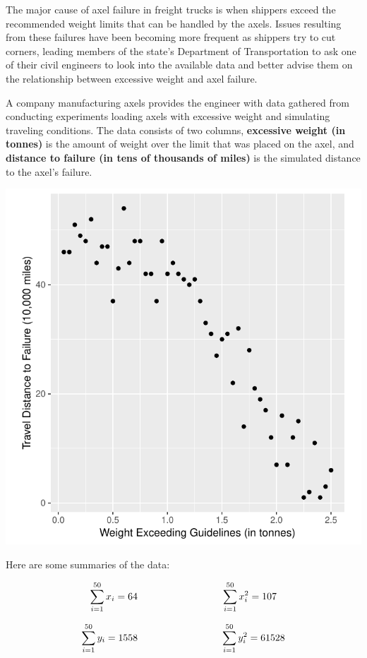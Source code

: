 \documentclass{examsetup}\usepackage[]{graphicx}\usepackage[]{color}
\newenvironment{knitrout}{}{} %
\begin{document}
\begin{questions}
\question

The major cause of axel failure in freight trucks is when shippers exceed the recommended weight limits that can be handled by the axels. 
Issues resulting from these failures have been becoming more frequent as shippers try to cut corners, 
leading members of the state's Department of Transportation to ask one of their civil engineers 
to look into the available data and better advise them on the relationship between excessive weight and axel failure.

A company manufacturing axels provides the engineer with data gathered from conducting experiments loading axels with excessive weight and simulating traveling conditions.
The data consists of two columns, \textbf{excessive weight (in tonnes)} is the amount of weight over the limit that was placed on the axel, and 
\textbf{distance to failure (in tens of thousands of miles)} is the simulated distance to the axel's failure. 



\begin{center}
\begin{knitrout}
\color{fgcolor}
\includegraphics[width=.5\linewidth]{figure/unnamed-chunk-13-1} 

\end{knitrout}
\end{center}

Here are some summaries of the data:

$$
\sum_{i=1}^{50} x_i = 64 \hspace{3cm} \sum_{i=1}^{50} x_i^2 = 107 \\
$$

$$
\sum_{i=1}^{50} y_i = 1558 \hspace{3cm} \sum_{i=1}^{50} y_i^2 = 61528 \\
$$


\end{questions}
\end{document}
